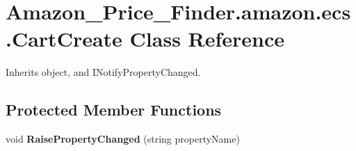 \hypertarget{class_amazon___price___finder_1_1amazon_1_1ecs_1_1_cart_create}{\section{Amazon\-\_\-\-Price\-\_\-\-Finder.\-amazon.\-ecs.\-Cart\-Create Class Reference}
\label{class_amazon___price___finder_1_1amazon_1_1ecs_1_1_cart_create}
}


 




Inherits object, and I\-Notify\-Property\-Changed.

\subsection*{Protected Member Functions}
\begin{DoxyCompactItemize}
\item 
\hypertarget{class_amazon___price___finder_1_1amazon_1_1ecs_1_1_cart_create_aabc313dca121fd401b40ae2a0ce4293c}{void {\bfseries Raise\-Property\-Changed} (string property\-Name)}\label{class_amazon___price___finder_1_1amazon_1_1ecs_1_1_cart_create_aabc313dca121fd401b40ae2a0ce4293c}

\end{DoxyCompactItemize}
